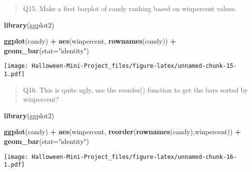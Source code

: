 \documentclass[
]{article}
\newenvironment{Shaded}{\begin{snugshade}}{\end{snugshade}}
\newcommand{\AttributeTok}[1]{\textcolor[rgb]{0.13,0.29,0.53}{#1}}
\newcommand{\FunctionTok}[1]{\textcolor[rgb]{0.13,0.29,0.53}{\textbf{#1}}}
\newcommand{\NormalTok}[1]{#1}
\newcommand{\OtherTok}[1]{\textcolor[rgb]{0.56,0.35,0.01}{#1}}
\newcommand{\SpecialCharTok}[1]{\textcolor[rgb]{0.81,0.36,0.00}{\textbf{#1}}}
\newcommand{\StringTok}[1]{\textcolor[rgb]{0.31,0.60,0.02}{#1}}
\begin{document}
\begin{quote}
Q15. Make a first barplot of candy ranking based on winpercent values.
\end{quote}

\begin{Shaded}
\begin{Highlighting}[]
\FunctionTok{library}\NormalTok{(ggplot2)}

\FunctionTok{ggplot}\NormalTok{(candy) }\SpecialCharTok{+} 
  \FunctionTok{aes}\NormalTok{(winpercent, }\FunctionTok{rownames}\NormalTok{(candy)) }\SpecialCharTok{+}
  \FunctionTok{geom\_bar}\NormalTok{(}\AttributeTok{stat=}\StringTok{"identity"}\NormalTok{)}
\end{Highlighting}
\end{Shaded}

\texttt{[image: Halloween-Mini-Project\_files/figure-latex/unnamed-chunk-15-1.pdf]}

\begin{quote}
Q16. This is quite ugly, use the reorder() function to get the bars
sorted by winpercent?
\end{quote}

\begin{Shaded}
\begin{Highlighting}[]
\FunctionTok{library}\NormalTok{(ggplot2)}

\FunctionTok{ggplot}\NormalTok{(candy) }\SpecialCharTok{+} 
  \FunctionTok{aes}\NormalTok{(winpercent, }\FunctionTok{reorder}\NormalTok{(}\FunctionTok{rownames}\NormalTok{(candy),winpercent)) }\SpecialCharTok{+}
  \FunctionTok{geom\_bar}\NormalTok{(}\AttributeTok{stat=}\StringTok{"identity"}\NormalTok{)}
\end{Highlighting}
\end{Shaded}

\texttt{[image: Halloween-Mini-Project\_files/figure-latex/unnamed-chunk-16-1.pdf]}

\begin{Shaded}
\end{Shaded}
\end{document}
